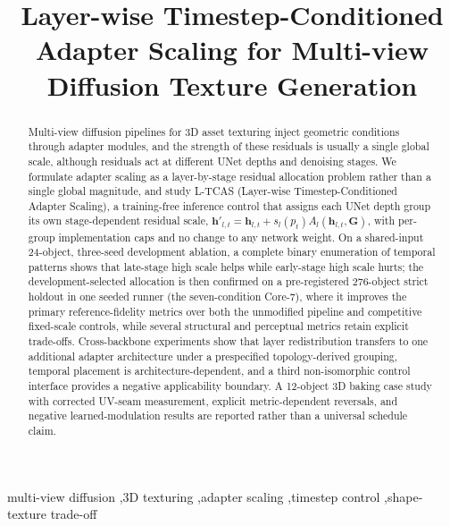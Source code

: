 \documentclass[times,twocolumn,final]{elsarticle}
\begin{document}
\begin{frontmatter}

\title{Layer-wise Timestep-Conditioned Adapter Scaling for Multi-view Diffusion Texture Generation}


\begin{abstract}
Multi-view diffusion pipelines for 3D asset texturing inject geometric conditions through adapter modules, and the strength of these residuals is usually a single global scale, although residuals act at different UNet depths and denoising stages. We formulate adapter scaling as a layer-by-stage residual allocation problem rather than a single global magnitude, and study L-TCAS (Layer-wise Timestep-Conditioned Adapter Scaling), a training-free inference control that assigns each UNet depth group its own stage-dependent residual scale, $\mathbf{h}'_{l,t}=\mathbf{h}_{l,t}+s_l(p_t)A_l(\mathbf{h}_{l,t},\mathbf{G})$, with per-group implementation caps and no change to any network weight. On a shared-input 24-object, three-seed development ablation, a complete binary enumeration of temporal patterns shows that late-stage high scale helps while early-stage high scale hurts; the development-selected allocation is then confirmed on a pre-registered 276-object strict holdout in one seeded runner (the seven-condition Core-7), where it improves the primary reference-fidelity metrics over both the unmodified pipeline and competitive fixed-scale controls, while several structural and perceptual metrics retain explicit trade-offs. Cross-backbone experiments show that layer redistribution transfers to one additional adapter architecture under a prespecified topology-derived grouping, temporal placement is architecture-dependent, and a third non-isomorphic control interface provides a negative applicability boundary. A 12-object 3D baking case study with corrected UV-seam measurement, explicit metric-dependent reversals, and negative learned-modulation results are reported rather than a universal schedule claim.
\end{abstract}

\begin{keyword}
\KWD
multi-view diffusion \sep 3D texturing \sep adapter scaling \sep timestep control \sep shape-texture trade-off
\end{keyword}

\end{frontmatter}
\end{document}
